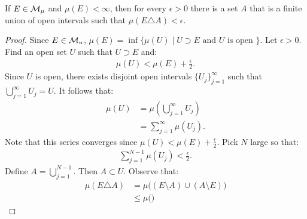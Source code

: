     \begin{exercise}
        If $E \in \mathcal{M}_\mu$ and $\mu(E) < \infty$, then for every $\epsilon > 0$ there is a set $A$ that is a finite union of open intervals such that $\mu(E \triangle A) < \epsilon$.
    \end{exercise}
        \begin{proof}
            Since $E \in \mathcal{M}_u$, $\mu(E) = \inf\{\mu(U) \mid U \supset E \text{ and } U \text{ is open }\}$. Let $\epsilon > 0$. Find an open set $U$ such that $U \supset E$ and:
                \begin{equation*}
                \begin{split}
                    \mu(U) < \mu(E) + \frac{\epsilon}{2}.
                \end{split}
                \end{equation*}
            Since $U$ is open, there exists disjoint open intervals $\{U_j\}_{j = 1}^\infty$ such that $\bigcup_{j = 1}^\infty U_j = U$. It follows that:
                \begin{equation*}
                \begin{split}
                    \mu(U) 
                    & = \mu \left( \bigcup_{j = 1}^\infty U_j \right) \\
                    & = \sum_{j = 1}^\infty \mu(U_j).
                \end{split}
                \end{equation*}
            Note that this series converges since $\mu(U) < \mu(E) + \frac{\epsilon}{2}$. Pick $N$ large so that:
                \begin{equation*}
                \begin{split}
                    \sum_{j = 1}^{N-1}\mu(U_j) < \frac{\epsilon}{2}.
                \end{split}
                \end{equation*}
            Define $A = \bigcup_{j = 1}^{N-1}$. Then $A \subset U$. Observe that:
                \begin{equation*}
                \begin{split}
                    \mu(E \triangle A)
                    & = \mu\bigl((E \setminus A) \cup (A \setminus E)\bigr) \\
                    & \leq \mu \bigl(\bigr)
                \end{split}
                \end{equation*}
        \end{proof}
\fi